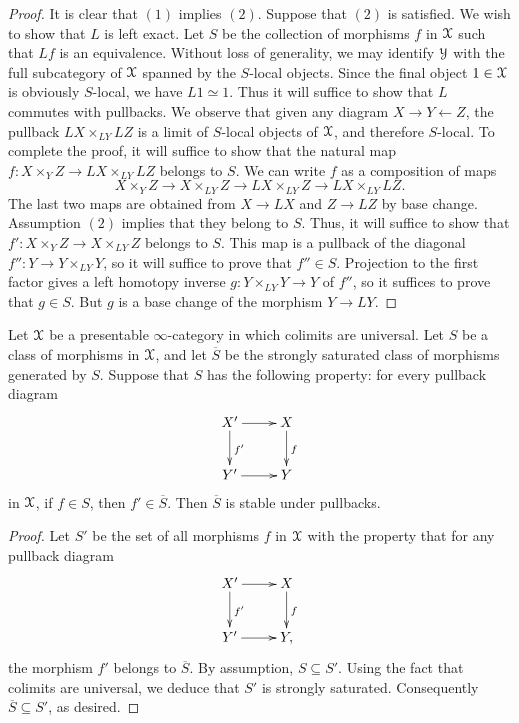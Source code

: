 \begin{proof}
It is clear that $(1)$ implies $(2)$. Suppose that $(2)$ is satisfied. We wish to show that $L$ is
left exact. Let $S$ be the collection of morphisms $f$ in $\operatorname{\mathcal{X}}$ such that $Lf$ is an equivalence.
Without loss of generality, we may identify $\operatorname{\mathcal{Y}}$ with the full subcategory of $\operatorname{\mathcal{X}}$ spanned by the $S$-local objects. Since the final object $1 \in
\operatorname{\mathcal{X}}$ is obviously $S$-local, we have $L1 \simeq 1$. Thus it will
suffice to show that $L$ commutes with pullbacks. We observe that given
any diagram $X \rightarrow Y \leftarrow Z$, the pullback $LX  \times_{LY} LZ$ is a limit
of $S$-local objects of $\operatorname{\mathcal{X}}$, and therefore $S$-local. To complete the proof, it will suffice
to show that the natural map $f: X \times_Y Z \rightarrow LX \times_{LY} LZ$ belongs to $S$.
We can write $f$ as a composition
of maps $$X \times_Y Z \rightarrow X \times_{LY} Z \rightarrow LX
\times_{LY} Z \rightarrow LX \times_{LY} LZ.$$ The last two maps
are obtained from $X \rightarrow LX$ and $Z \rightarrow LZ$ by
base change. Assumption $(2)$ implies that they belong to $S$. Thus, it will
suffice to show that $f': X \times_Y Z \rightarrow X \times_{LY}
Z$ belongs to $S$. This map is a pullback of the diagonal $f'': Y \rightarrow Y \times_{LY} Y$, so it will suffice to prove that $f'' \in S$.
Projection to the first factor gives a left homotopy inverse $g: Y \times_{LY} Y
\rightarrow Y$ of $f''$, so it suffices to prove that $g \in S$. 
But $g$ is a base change of the morphism $Y \rightarrow LY$.
\end{proof}

\begin{proposition}\label{swimmer}
Let $\operatorname{\mathcal{X}}$ be a presentable $\infty$-category in which colimits are universal. Let $S$ be a class of morphisms in $\operatorname{\mathcal{X}}$, and let $\overline{S}$ be the strongly saturated class of morphisms generated by $S$. Suppose
that $S$ has the following property: for every pullback diagram
$$ \xymatrix{ X' \ar[r] \ar[d]^{f'} & X \ar[d]^{f} \\
Y' \ar[r] & Y }$$ in $\operatorname{\mathcal{X}}$, if $f \in S$, then $f' \in \overline{S}$. Then $\overline{S}$ is stable under pullbacks.
\end{proposition}

\begin{proof}
Let $S'$ be the set of all morphisms $f$ in $\operatorname{\mathcal{X}}$ with the property that for any pullback diagram
$$ \xymatrix{ X' \ar[r] \ar[d]^{f'} & X \ar[d]^{f} \\
Y' \ar[r] & Y, }$$
the morphism $f'$ belongs to $\overline{S}$. By assumption, $S \subseteq S'$. Using the fact
that colimits are universal, we deduce that $S'$ is strongly saturated. Consequently
$\overline{S} \subseteq S'$, as desired.
\end{proof}

